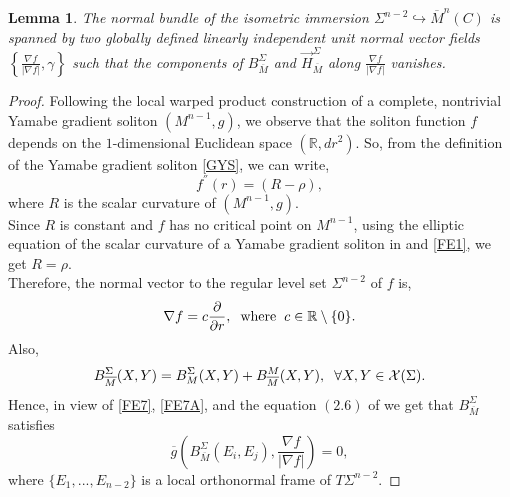\documentclass[11pt]{amsart}
\newtheorem{lemma}[theorem]{Lemma}
\numberwithin{equation}{section}
\begin{document}
\begin{lemma}\label{lemma1}
    The normal bundle of the isometric immersion $\Sigma^{n-2} \hookrightarrow \overline{M}^n(C)$  is spanned by two globally defined linearly independent unit normal vector fields $\left\{ \frac{\nabla f}{|\nabla f|}, \gamma\right\}$ such that the components of $B^{\Sigma}_{\overline{M}}$ and $\vec{H}^{\Sigma}_{\overline{M}}$ along $\frac{\nabla f}{|\nabla f|}$ vanishes.
    
\end{lemma}
    
\begin{proof}
Following the local warped product construction \cite{CSY} of a complete, nontrivial Yamabe gradient soliton $(M^{n-1}, g)$, we observe that the soliton function $f$ depends on the $1$-dimensional Euclidean space $(\mathbb{R}, dr^2)$. So, from the definition of the Yamabe gradient soliton \eqref{GYS}, we can write,
\begin{equation}\label{FE1}
    f^{''}(r)=(R-\rho),
\end{equation}
where $R$ is the scalar curvature of $(M^{n-1}, g)$.\\
Since $R$ is constant and $f$ has no critical point on $M^{n-1}$, using the elliptic equation of the scalar curvature of a Yamabe gradient soliton in \cite[Page 363]{daskalopoulos} and \eqref{FE1}, we get $R=\rho$.\\
Therefore, the normal vector to the regular level set $\Sigma^{n-2}$ of $f$ is,
\begin{equation}\label{FE7}
   \nabla f= c \frac{\partial}{\partial r}, \hspace{2mm}\text{where}\hspace{2mm} c\in \mathbb{R}\setminus \{0\}. 
\end{equation}
Also, 
\begin{equation}\label{FE7A}
    B^{\Sigma}_{\overline{M}}(X, Y)= B^{\Sigma}_M(X, Y)+ B^M_{\overline{M}}(X, Y), \hspace{2mm}\forall X, Y\in \mathcal{X}(\Sigma).
\end{equation}
Hence, in view of \eqref{FE7}, \eqref{FE7A}, and the equation $(2.6)$ of \cite{CSY} we get that  $B^{\Sigma}_{\overline{M}}$ satisfies
\begin{equation*}
    \overline{g}\left( B^{\Sigma}_{\overline{M}}(E_i, E_j), \frac{\nabla f}{|\nabla f|} \right)=0,
\end{equation*}
where $\{E_1, ..., E_{n-2} \}$ is a local orthonormal frame of $T{\Sigma}^{n-2}$.
\end{proof}
\end{document}
